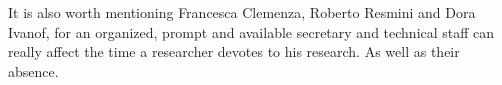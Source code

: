 It is also worth mentioning Francesca Clemenza, Roberto Resmini and Dora
Ivanof, for an organized, prompt and available secretary and technical staff
can really affect the time a researcher devotes to his research. As well as
their absence.
